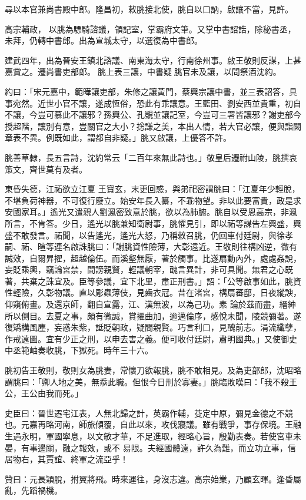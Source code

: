 \begin{pinyinscope}
 尋以本官兼尚書殿中郎。隆昌初，敕朓接北使，朓自以口訥，啟讓不當，見許。



 高宗輔政，
 以朓為驃騎諮議，領記室，掌霸府文筆。又掌中書詔誥，除秘書丞，未拜，仍轉中書郎。出為宣城太守，以選復為中書郎。



 建武四年，出為晉安王鎮北諮議、南東海太守，行南徐州事。啟王敬則反謀，上甚嘉賞之。遷尚書吏部郎。朓上表三讓，中書疑朓官未及讓，以問祭酒沈約。



 約曰：「宋元嘉中，範曄讓吏部，朱修之讓黃門，蔡興宗讓中書，並三表詔答，具事宛然。近世小官不讓，遂成恆俗，恐此有乖讓意。王藍田、劉安西並貴重，初自不讓，今豈可慕此不讓邪？孫興公、孔覬並讓記室，今豈可三署皆讓邪？謝吏部今授超階，讓別有意，豈關官之大小？捴謙之美，本出人情，若大官必讓，便與詣闕章表不異。例既如此，謂都自非疑。」朓又啟讓，上優答不許。



 朓善草隸，長五言詩，沈約常云「二百年來無此詩也。」敬皇后遷祔山陵，朓撰哀策文，齊世莫有及者。



 東昏失德，江祏欲立江夏
 王寶玄，末更回惑，與弟祀密謂朓曰：「江夏年少輕脫，不堪負荷神器，不可復行廢立。始安年長入纂，不乖物望。非以此要富貴，政是求安國家耳。」遙光又遣親人劉渢密致意於朓，欲以為肺腑。朓自以受恩高宗，非渢所言，不肯答。少日，遙光以朓兼知衛尉事，朓懼見引，即以祏等謀告左興盛，興盛不敢發言。祏聞，以告遙光，遙光大怒，乃稱敕召朓，仍回車付廷尉，與徐孝嗣、祏、暄等連名啟誅朓曰：「謝朓資性險薄，大彰遠近。王敬則往構凶逆，微有誠效，自爾昇擢，超越倫伍。而溪壑無厭，著於觸事。比遂扇動內外，處處姦說，妄貶乘輿，竊論宮禁，間謗親賢，輕議朝宰，醜言異計，非可具聞。無君之心既著，共棄之誅宜及。臣等參議，宜下北里，肅正刑書。」詔：「公等啟事如此，朓資性輕險，久彰物議。直以彫蟲薄伎，見齒衣冠。昔在渚宮，構扇蕃邸，日夜縱諛，仰窺俯畫。及還京師，翻自宣露，江、漢無波，以為己功。素
 論於茲而盡，縉紳所以側目。去夏之事，頗有微誠，賞擢曲加，逾邁倫序，感悅未聞，陵競彌著。遂復矯構風塵，妄惑朱紫，詆貶朝政，疑間親賢。巧言利口，見醜前志。涓流纖孽，作戒遠圖。宜有少正之刑，以申去害之義。便可收付廷尉，肅明國典。」又使御史中丞範岫奏收朓，下獄死。時年三十六。



 朓初告王敬則，敬則女為朓妻，常懷刀欲報朓，朓不敢相見。及為吏部郎，沈昭略謂朓曰：「卿人地之美，無忝此職。但恨今日刑於寡妻。」朓臨敗嘆曰：「我不殺王公，王公由我而死。」



 史臣曰：晉世遷宅江表，人無北歸之計，英霸作輔，芟定中原，彌見金德之不競也。元嘉再略河南，師旅傾覆，自此以來，攻伐寢議。雖有戰爭，事存保境。王融生遇永明，軍國寧息，以文敏才華，不足進取，經略心旨，殷勤表奏。若使宮車未晏，有事邊關，融之報效，或不
 易限。夫經國體遠，許久為難，而立功立事，信居物右，其賈誼、終軍之流亞乎！



 贊曰：元長穎脫，拊翼將飛。時來運往，身沒志違。高宗始業，乃顧玄暉。逢昏屬亂，先蹈禍機。



\end{pinyinscope}